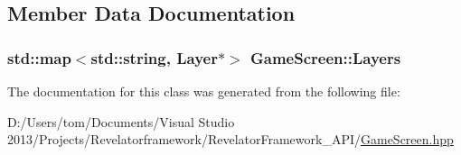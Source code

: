 \subsection{Member Data Documentation}
\hypertarget{class_game_screen_ab134d175092c247558838f11d66e9493}{
\subsubsection[{Layers}]{\setlength{\rightskip}{0pt plus 5cm}std\-::map$<$std\-::string, {\bf Layer}$\ast$$>$ Game\-Screen\-::\-Layers\hspace{0.3cm}{\ttfamily [private]}}}\label{class_game_screen_ab134d175092c247558838f11d66e9493}


The documentation for this class was generated from the following file\-:\begin{DoxyCompactItemize}
\item 
D\-:/\-Users/tom/\-Documents/\-Visual Studio 2013/\-Projects/\-Revelatorframework/\-Revelator\-Framework\-\_\-\-A\-P\-I/\hyperlink{_game_screen_8hpp}{Game\-Screen.\-hpp}\end{DoxyCompactItemize}
